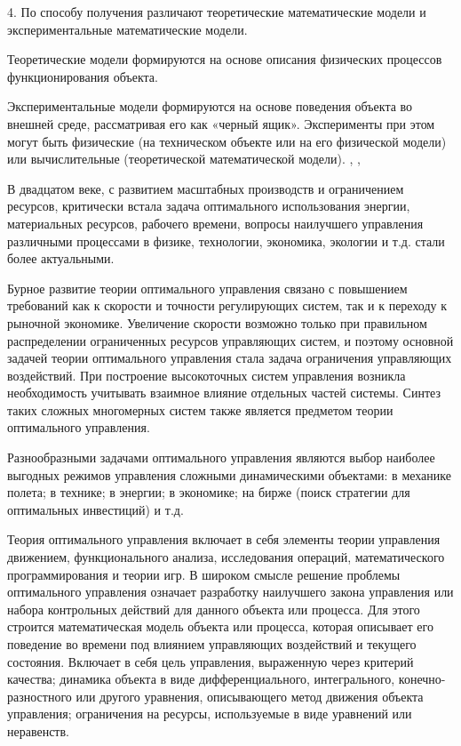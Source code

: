 4. По способу получения различают теоретические математические модели и экспериментальные математические модели.


Теоретические модели формируются на основе описания физических процессов функционирования объекта.


Экспериментальные модели формируются на основе поведения объекта во внешней среде, рассматривая его как «черный ящик». Эксперименты при этом могут быть физические (на техническом объекте или на его физической модели) или вычислительные (теоретической математической модели). \cite{b5}, \cite{b6}, \cite{b7}


В двадцатом веке, с развитием масштабных производств и ограничением ресурсов, критически встала задача оптимального использования энергии, материальных ресурсов, рабочего времени, вопросы наилучшего управления различными процессами в физике, технологии, экономика, экологии и т.д. стали более актуальными.


Бурное развитие теории оптимального управления связано с повышением требований как к скорости и точности регулирующих систем, так и к переходу к рыночной экономике. Увеличение скорости возможно только при правильном распределении ограниченных ресурсов управляющих систем, и поэтому основной задачей теории оптимального управления стала задача ограничения управляющих воздействий. При построение высокоточных систем управления возникла необходимость учитывать взаимное влияние отдельных частей системы. Синтез таких сложных многомерных систем также является предметом теории оптимального управления.


Разнообразными задачами оптимального управления являются выбор наиболее выгодных режимов управления сложными динамическими объектами: в механике полета; в технике; в энергии; в экономике; на бирже (поиск стратегии для оптимальных инвестиций) и т.д.


Теория оптимального управления включает в себя элементы теории управления движением, функционального анализа, исследования операций, математического программирования и теории игр. В широком смысле решение проблемы оптимального управления означает разработку наилучшего закона управления или набора контрольных действий для данного объекта или процесса. Для этого строится математическая модель объекта или процесса, которая описывает его поведение во времени под влиянием управляющих воздействий и текущего состояния. Включает в себя цель управления, выраженную через критерий качества; динамика объекта в виде дифференциального, интегрального, конечно-разностного или другого уравнения, описывающего метод движения объекта управления; ограничения на ресурсы, используемые в виде уравнений или неравенств.


